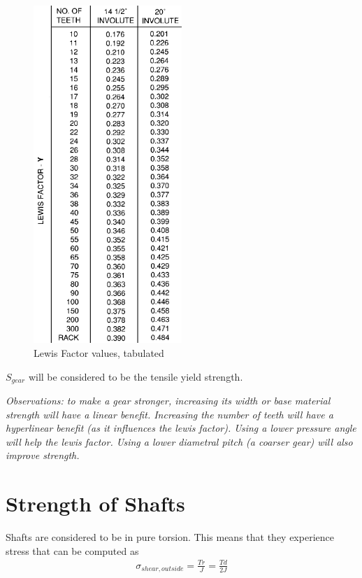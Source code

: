 \documentclass[10pt,letterpaper]{article}
\begin{document}
	\begin{figure}[H]
		\includegraphics[width=0.5\textwidth]{lewis_factor_table.png}
		\caption{Lewis Factor values, tabulated}
	\end{figure}

	$S_{gear}$ will be considered to be the tensile yield strength.

	\textit{Observations: to make a gear stronger, increasing its width or base material strength will have a linear benefit. Increasing the number of teeth will have a hyperlinear benefit (as it influences the lewis factor). Using a lower pressure angle will help the lewis factor. Using a lower diametral pitch (a coarser gear) will also improve strength.}

\section{Strength of Shafts}
	Shafts are considered to be in pure torsion. This means that they experience stress that can be computed as
	\begin{align}
		\sigma_{shear,outside} = \frac{T r}{J} = \frac{T d}{2 J}
	\end{align}
\end{document}
